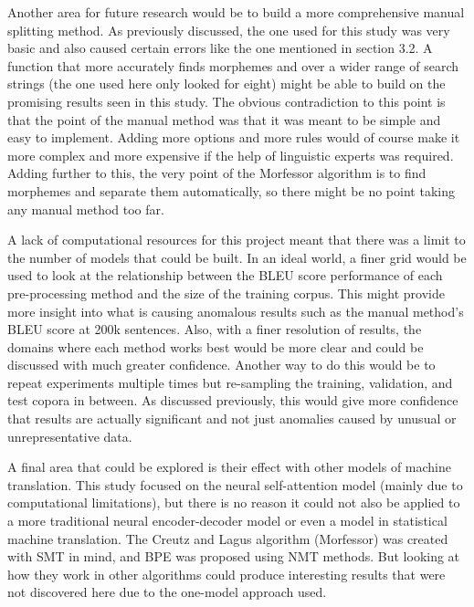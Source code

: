 \documentclass[11pt]{article}
\begin{document}
\bigskip

Another area for future research would be to build a more comprehensive manual splitting method. As previously discussed, the one used for this study was very basic and also caused certain errors like the one mentioned in section 3.2. A function that more accurately finds morphemes and over a wider range of search strings (the one used here only looked for eight) might be able to build on the promising results seen in this study. The obvious contradiction to this point is that the point of the manual method was that it was meant to be simple and easy to implement. Adding more options and more rules would of course make it more complex and more expensive if the help of linguistic experts was required. Adding further to this, the very point of the Morfessor algorithm is to find morphemes and separate them automatically, so there might be no point taking any manual method too far.

\bigskip

A lack of computational resources for this project meant that there was a limit to the number of models that could be built. In an ideal world, a finer grid would be used to look at the relationship between the BLEU score performance of each pre-processing method and the size of the training corpus. This might provide more insight into what is causing anomalous results such as the manual method's BLEU score at 200k sentences. Also, with a finer resolution of results, the domains where each method works best would be more clear and could be discussed with much greater confidence. Another way to do this would be to repeat experiments multiple times but re-sampling the training, validation, and test copora in between. As discussed previously, this would give more confidence that results are actually significant and not just anomalies caused by unusual or unrepresentative data.

\bigskip

A final area that could be explored is their effect with other models of machine translation. This study focused on the neural self-attention model (mainly due to computational limitations), but there is no reason it could not also be applied to a more traditional neural encoder-decoder model or even a model in statistical machine translation. The Creutz and Lagus \citeyearpar{creutz-lagus-2002-unsupervised} algorithm (Morfessor) was created with SMT in mind, and BPE was proposed using NMT methods. But looking at how they work in other algorithms could produce interesting results that were not discovered here due to the one-model approach used.
\end{document}
